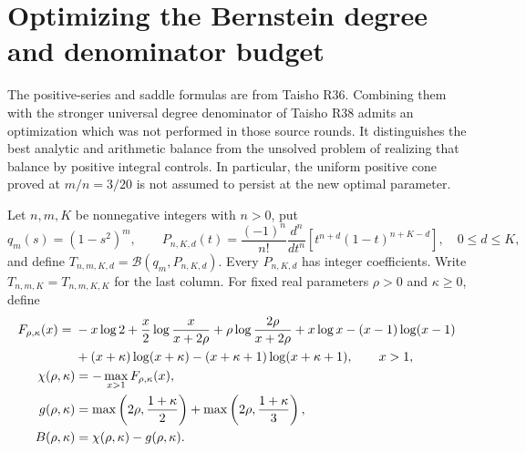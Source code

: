 \documentclass[11pt,a4paper]{article}
\numberwithin{equation}{section}
\theoremstyle{definition}\newtheorem{definition}[theorem]{Definition}
\theoremstyle{remark}\newtheorem{remark}[theorem]{Remark}
\begin{document}
\section{Optimizing the Bernstein degree and denominator budget}
\label{opt:taisho:optimization}

The positive-series and saddle formulas are from Taisho R36. Combining
them with the stronger universal degree denominator of Taisho R38 admits
an optimization which was not performed in those source rounds. It distinguishes the best analytic and
arithmetic balance from the unsolved problem of realizing that balance by
positive integral controls. In particular, the uniform positive cone proved
at $m/n=3/20$ is not assumed to persist at the new optimal parameter.

Let $n,m,K$ be nonnegative integers with $n>0$, put
\[
 q_m(s)=(1-s^2)^m,\qquad
 P_{n,K,d}(t)=\frac{(-1)^n}{n!}\frac{d^n}{dt^n}
          \left[t^{n+d}(1-t)^{n+K-d}\right],\quad 0\le d\le K,
\]
and define $T_{n,m,K,d}=\mathcal B(q_m,P_{n,K,d})$.
Every $P_{n,K,d}$ has integer coefficients. Write
$T_{n,m,K}=T_{n,m,K,K}$ for the last column.
For fixed real parameters $\rho>0$ and $\kappa\ge0$, define
\begin{align}
 F_{\rho,\kappa}(x)={}&-x\log2+
 \frac{x}{2}\log\frac{x}{x+2\rho}
 +\rho\log\frac{2\rho}{x+2\rho}
 +x\log x-(x-1)\log(x-1)\notag\\
 &+(x+\kappa)\log(x+\kappa)
 -(x+\kappa+1)\log(x+\kappa+1),\qquad x>1,\label{opt:taisho:F}\\
 \chi(\rho,\kappa)&=-\max_{x>1}F_{\rho,\kappa}(x),\label{opt:taisho:chi}\\
 g(\rho,\kappa)&=
 \max\left(2\rho,\frac{1+\kappa}{2}\right)
 +\max\left(2\rho,\frac{1+\kappa}{3}\right),\label{opt:taisho:g}\\
 B(\rho,\kappa)&=\chi(\rho,\kappa)-g(\rho,\kappa).
 \label{opt:taisho:budget}
\end{align}
\end{document}
